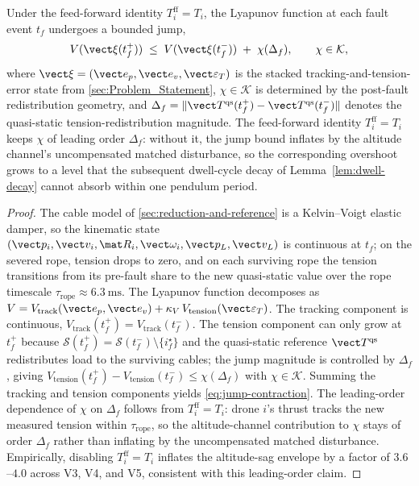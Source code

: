 \begin{lemma}
\label{lem:jump-continuity}
Under the feed-forward identity $T_i^{\mathrm{ff}} = T_i$, the Lyapunov function at each fault event $t_f$ undergoes a bounded jump,
\begin{equation}
  V(\vect\xi(t_f^+))
    \;\le\;
    V(\vect\xi(t_f^-))
    \;+\; \chi(\Delta_f),
  \qquad
  \chi \in \mathcal{K},
  \label{eq:jump-contraction}
\end{equation}
where $\vect\xi = (\vect e_p, \vect e_v, \vect\varepsilon_T)$ is the stacked tracking-and-tension-error state from \cref{sec:Problem_Statement}, $\chi \in \mathcal{K}$ is determined by the post-fault redistribution geometry, and $\Delta_f = \|\vect T^{\mathrm{qs}}(t_f^+) - \vect T^{\mathrm{qs}}(t_f^-)\|$ denotes the quasi-static tension-redistribution magnitude. The feed-forward identity $T_i^{\mathrm{ff}} = T_i$ keeps $\chi$ of leading order $\Delta_f$: without it, the jump bound inflates by the altitude channel's uncompensated matched disturbance, so the corresponding overshoot grows to a level that the subsequent dwell-cycle decay of Lemma~\ref{lem:dwell-decay} cannot absorb within one pendulum period.
\end{lemma}

\begin{proof}
The cable model of \cref{sec:reduction-and-reference} is a Kelvin--Voigt elastic damper, so the kinematic state $(\vect p_i, \vect v_i, \mat R_i, \vect\omega_i, \vect p_L, \vect v_L)$ is continuous at $t_f$; on the severed rope, tension drops to zero, and on each surviving rope the tension transitions from its pre-fault share to the new quasi-static value over the rope timescale $\tau_{\mathrm{rope}} \approx \SI{6.3}{\milli\second}$. The Lyapunov function decomposes as $V = V_{\mathrm{track}}(\vect e_p, \vect e_v)  + \kappa_V\,V_{\mathrm{tension}}(\vect\varepsilon_T)$. The tracking component is continuous, $V_{\mathrm{track}}(t_f^+) = V_{\mathrm{track}}(t_f^-)$. The tension component can only grow at $t_f^+$ because $\mathcal{S}(t_f^+) = \mathcal{S}(t_f^-) \setminus \{i_f^\star\}$ and the quasi-static reference $\vect T^{\mathrm{qs}}$ redistributes load to the surviving cables; the jump magnitude is controlled by $\Delta_f$, giving $V_{\mathrm{tension}}(t_f^+) - V_{\mathrm{tension}}(t_f^-) \le \chi(\Delta_f)$ with $\chi \in \mathcal{K}$. Summing the tracking and tension components yields \eqref{eq:jump-contraction}. The leading-order dependence of $\chi$ on $\Delta_f$ follows from $T_i^{\mathrm{ff}} = T_i$: drone $i$'s thrust tracks the new measured tension within $\tau_{\mathrm{rope}}$, so the altitude-channel contribution to $\chi$ stays of order $\Delta_f$ rather than inflating by the uncompensated matched disturbance. Empirically, disabling $T_i^{\mathrm{ff}} = T_i$ inflates the altitude-sag envelope by a factor of $3.6$--$4.0$ across V3, V4, and V5, consistent with this leading-order claim.
\end{proof}

